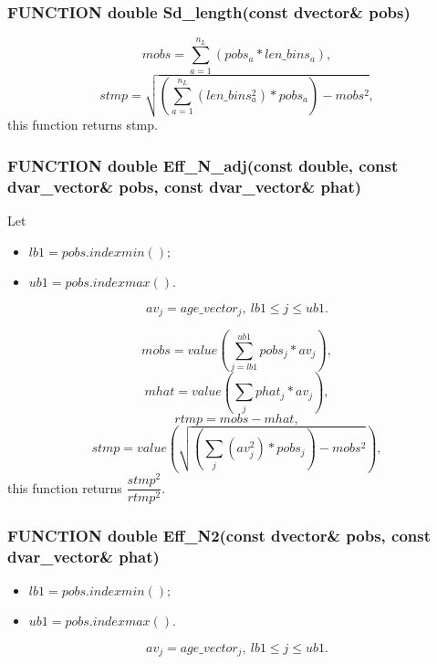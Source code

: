 \documentclass{article}
\begin{document}
\subsubsection{FUNCTION double Sd\_length(const dvector\& pobs)}
\begin{equation}
    mobs = \sum_{a=1}^{n_L}(pobs_a*len\_bins_a),
\end{equation}
\begin{equation}
    stmp = \sqrt{\left(\sum_{a=1}^{n_L}(len\_bins_a^2)*pobs_a\right) - mobs^2},
\end{equation}
this function returns stmp.\\

\subsubsection{FUNCTION double Eff\_N\_adj(const double, const dvar\_vector\& pobs, const dvar\_vector\& phat)}
Let
\begin{itemize}
    \item $lb1 = pobs.indexmin();$
    \item $ub1 = pobs.indexmax().$
\end{itemize}

\begin{equation}
    av_j = age\_vector_j, \ lb1\leq j \leq ub1.
\end{equation}

\begin{equation}
     mobs = value\left(\sum_{j=lb1}^{ub1}pobs_j*av_j\right),
\end{equation}
\begin{equation}
    mhat = value\left(\sum_{j}phat_j*av_j\right),
\end{equation}
\begin{equation}
    rtmp = mobs-mhat,
\end{equation}
\begin{equation}
    stmp = value\left(\sqrt{\left(\sum_{j}(av_j^2)*pobs_j\right) - mobs^2}\right),
\end{equation}
this function returns $\dfrac{stmp^2}{rtmp^2}$.\\

\subsubsection{FUNCTION double Eff\_N2(const dvector\& pobs, const dvar\_vector\& phat)}
\begin{itemize}
    \item $lb1 = pobs.indexmin();$
    \item $ub1 = pobs.indexmax()$.
\end{itemize}
\begin{equation}
    av_j = age\_vector_j, \ lb1\leq j \leq ub1.
\end{equation}
\end{document}

